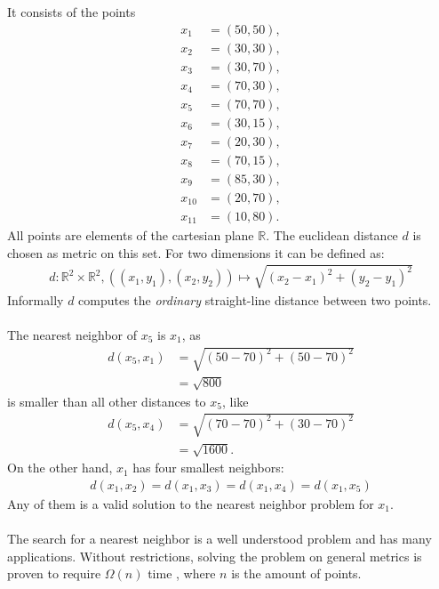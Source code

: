 	It consists of the points
	\begin{align*}
		x_1		&= (50, 50),\\
		x_2		&= (30, 30),\\
		x_3		&= (30, 70),\\
		x_4		&= (70, 30),\\
		x_5		&= (70, 70),\\
		x_6		&= (30, 15),\\
		x_7		&= (20, 30),\\
		x_8		&= (70, 15),\\
		x_9		&= (85, 30),\\
		x_{10}	&= (20, 70),\\
		x_{11}	&= (10, 80).
	\end{align*}
	All points are elements of the cartesian plane $\mathbb{R}$. The euclidean distance $d$ is chosen as metric on this set.
	For two dimensions it can be defined as:
	\begin{align*}
		d: \mathbb{R}^2 \times \mathbb{R}^2, ((x_1, y_1), (x_2, y_2)) \mapsto \sqrt{(x_2 - x_1)^2 + (y_2 - y_1)^2}
	\end{align*}
	Informally $d$ computes the \textit{ordinary} straight-line distance between two points.\\\\
	The nearest neighbor of $x_5$ is $x_1$, as
	\begin{align*}
		d(x_5, x_1)	&= \sqrt{(50 - 70)^2 + (50 - 70)^2}\\
				&= \sqrt{800}
	\end{align*}
	is smaller than all other distances to $x_5$, like
	\begin{align*}
		d(x_5, x_4)	&= \sqrt{(70 - 70)^2 + (30 - 70)^2}\\
				&= \sqrt{1600}.
	\end{align*}
	On the other hand, $x_1$ has four smallest neighbors:
	\begin{align*}
		d(x_1, x_2) = d(x_1, x_3) = d(x_1, x_4) = d(x_1, x_5)
	\end{align*}
	Any of them is a valid solution to the nearest neighbor problem for $x_1$.\\\\
	The search for a nearest neighbor is a well understood problem  and has many
	applications. Without restrictions, solving the problem on general metrics is proven to
	require $\Omega(n)$ time , where $n$ is the amount of points.
	
